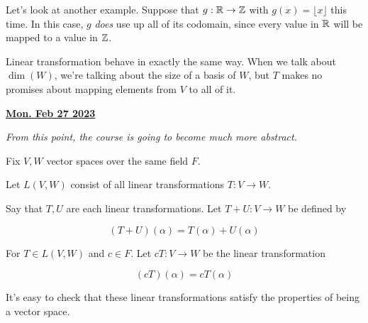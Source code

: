 \documentclass[12pt]{article}
\renewcommand{\date}[1]{\underline{\bf #1}}
\begin{document}
  Let's look at another example. Suppose that $g: {\mathbb R} \to {\mathbb Z}$ with $g(x) =
  \lfloor x \rfloor$ this time. In this case, $g$ {\it does} use up all of its
  codomain, since every value in ${\mathbb R}$ will be mapped to a value in ${\mathbb Z}$.

  Linear transformation behave in exactly the same way. When we talk about
  $\dim(W)$, we're talking about the size of a basis of $W$, but $T$ makes no
  promises about mapping elements from $V$ to all of it.

  \date{Mon. Feb 27 2023}
  
  {\it From this point, the course is going to become much more abstract.}

  Fix $V, W$ vector spaces over the same field $F$.

  Let $L(V, W)$ consist of all linear transformations $T: V \to W$.

  {
    Say that $T, U$ are each linear transformations. Let $T + U: V \to W$ be
    defined by

    \[
      (T + U)(\alpha) = T(\alpha) + U(\alpha)
    \]

    For $T \in L(V, W)$ and $c \in F$. Let $cT: V \to W$ be the linear
    transformation

    \[
      (cT)(\alpha) = cT(\alpha)
    \]

    It's easy to check that these linear transformations satisfy the properties
    of being a vector space.
  }
\end{document}
